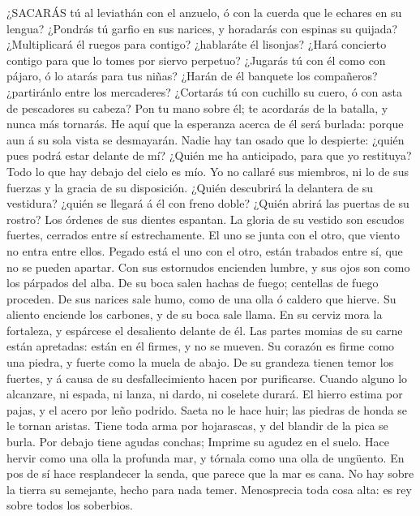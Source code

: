  ¿SACARÁS tú al leviathán con el anzuelo, ó con la cuerda
que le echares en su lengua?  ¿Pondrás tú garfio en sus
narices, y horadarás con espinas su quijada?  ¿Multiplicará
él ruegos para contigo? ¿hablaráte él lisonjas?  ¿Hará
concierto contigo para que lo tomes por siervo perpetuo? 
¿Jugarás tú con él como con pájaro, ó lo atarás para tus niñas?
 ¿Harán de él banquete los compañeros? ¿partiránlo entre los
mercaderes?  ¿Cortarás tú con cuchillo su cuero, ó con asta
de pescadores su cabeza?  Pon tu mano sobre él; te acordarás
de la batalla, y nunca más tornarás.  He aquí que la
esperanza acerca de él será burlada: porque aun á su sola vista se
desmayarán.  Nadie hay tan osado que lo despierte: ¿quién
pues podrá estar delante de mí?  ¿Quién me ha anticipado,
para que yo restituya? Todo lo que hay debajo del cielo es mío.
 Yo no callaré sus miembros, ni lo de sus fuerzas y la
gracia de su disposición.  ¿Quién descubrirá la delantera
de su vestidura? ¿quién se llegará á él con freno doble? 
¿Quién abrirá las puertas de su rostro? Los órdenes de sus dientes
espantan.  La gloria de su vestido son escudos fuertes,
cerrados entre sí estrechamente.  El uno se junta con el
otro, que viento no entra entre ellos.  Pegado está el uno
con el otro, están trabados entre sí, que no se pueden apartar.
 Con sus estornudos encienden lumbre, y sus ojos son como
los párpados del alba.  De su boca salen hachas de fuego;
centellas de fuego proceden.  De sus narices sale humo,
como de una olla ó caldero que hierve.  Su aliento enciende
los carbones, y de su boca sale llama.  En su cerviz mora
la fortaleza, y espárcese el desaliento delante de él.  Las
partes momias de su carne están apretadas: están en él firmes, y no se
mueven.  Su corazón es firme como una piedra, y fuerte como
la muela de abajo.  De su grandeza tienen temor los
fuertes, y á causa de su desfallecimiento hacen por purificarse.
 Cuando alguno lo alcanzare, ni espada, ni lanza, ni dardo,
ni coselete durará.  El hierro estima por pajas, y el acero
por leño podrido.  Saeta no le hace huir; las piedras de
honda se le tornan aristas.  Tiene toda arma por
hojarascas, y del blandir de la pica se burla.  Por debajo
tiene agudas conchas; Imprime su agudez en el suelo.  Hace
hervir como una olla la profunda mar, y tórnala como una olla de
ungüento.  En pos de sí hace resplandecer la senda, que
parece que la mar es cana.  No hay sobre la tierra su
semejante, hecho para nada temer.  Menosprecia toda cosa
alta: es rey sobre todos los soberbios.

